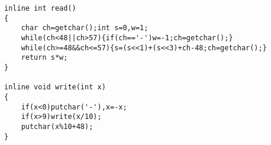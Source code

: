 \begin{lstlisting}
inline int read()
{
    char ch=getchar();int s=0,w=1;
    while(ch<48||ch>57){if(ch=='-')w=-1;ch=getchar();}
    while(ch>=48&&ch<=57){s=(s<<1)+(s<<3)+ch-48;ch=getchar();}
    return s*w;
}

inline void write(int x)
{
    if(x<0)putchar('-'),x=-x;
    if(x>9)write(x/10);
    putchar(x%10+48);
}
\end{lstlisting}